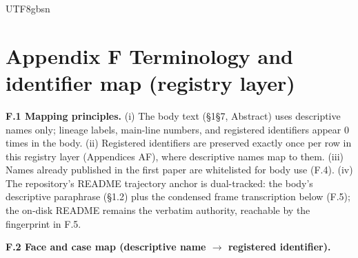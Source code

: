 \documentclass[11pt,letterpaper]{article}
\begin{document}
\begin{CJK}{UTF8}{gbsn}
\section*{Appendix F \textemdash{} Terminology and identifier map (registry layer)}

\textbf{F.1 Mapping principles.} (i) The body text (\S{}1\textendash{}\S{}7, Abstract) uses descriptive names only; lineage labels, main-line numbers, and registered identifiers appear 0 times in the body. (ii) Registered identifiers are preserved exactly once per row in this registry layer (Appendices A\textendash{}F), where descriptive names map to them. (iii) Names already published in the first paper are whitelisted for body use (F.4). (iv) The repository's README trajectory anchor is dual-tracked: the body's descriptive paraphrase (\S{}1.2) plus the condensed frame transcription below (F.5); the on-disk README remains the verbatim authority, reachable by the fingerprint in F.5.

\textbf{F.2 Face and case map (descriptive name \ensuremath{\to} registered identifier).}


\end{CJK}
\end{document}
